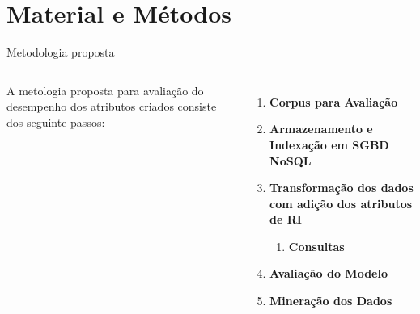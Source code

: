 \documentclass[%
  10pt,%
  aspectratio = 169,%
  compress,%
  t,%
]{beamer}%
\begin{document}
\section{Material e Métodos}\label{sec:matmet}

    \begin{frame}{}{Metodologia proposta}
        \begin{columns}[t]
            A metologia proposta para avaliação do desempenho dos atributos criados consiste dos seguinte passos:
            
            \begin{enumerate}
                \item \textbf{Corpus para Avaliação}
                \item \textbf{Armazenamento e Indexação em  SGBD NoSQL}
                \item \textbf{Transformação dos dados com adição dos atributos de RI}
                \begin{enumerate}
                    \item \textbf{Consultas}
                \end{enumerate}
                \item \textbf{Avaliação do Modelo}
                
                \item \textbf{Mineração dos Dados}
            \end{enumerate}
            
            
        \end{columns}
    \end{frame}
\end{document}

